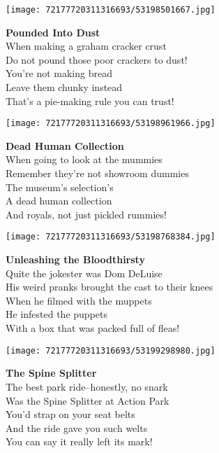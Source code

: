 \documentclass[10pt,letterpaper]{article}
\begin{document}
\begin{center}\texttt{[image: 72177720311316693/53198501667.jpg]}
\end{center}
\begin{center}
\textbf{Pounded Into Dust}\\
\vskip 0.2in
When making a graham cracker crust\\
Do not pound those poor crackers to dust!\\
You're not making bread\\
Leave them chunky instead\\
That's a pie-making rule you can trust!\\
\end{center}
\pagebreak

\begin{center}
\texttt{[image: 72177720311316693/53198961966.jpg]}
\end{center}

\begin{center}
\textbf{Dead Human Collection}\\
\vskip 0.2in
When going to look at the mummies\\
Remember they're not showroom dummies\\
The museum's selection's\\
A dead human collection\\
And royals, not just pickled rummies!\\
\end{center}
\pagebreak

\begin{center}\texttt{[image: 72177720311316693/53198768384.jpg]}
\end{center}
\begin{center}
\textbf{Unleashing the Bloodthirsty}\\
\vskip 0.2in
Quite the jokester was Dom DeLuise\\
His weird pranks brought the cast to their knees\\
When he filmed with the muppets\\
He infested the puppets\\
With a box that was packed full of fleas!\\
\end{center}
\pagebreak

\begin{center}\texttt{[image: 72177720311316693/53199298980.jpg]}
\end{center}
\begin{center}
\textbf{The Spine Splitter}\\
\vskip 0.2in
The best park ride--honestly, no snark\\
Was the Spine Splitter at Action Park\\
You'd strap on your seat belts\\
And the ride gave you such welts\\
You can say it really left its mark!\\
\end{center}
\pagebreak
\end{document}
